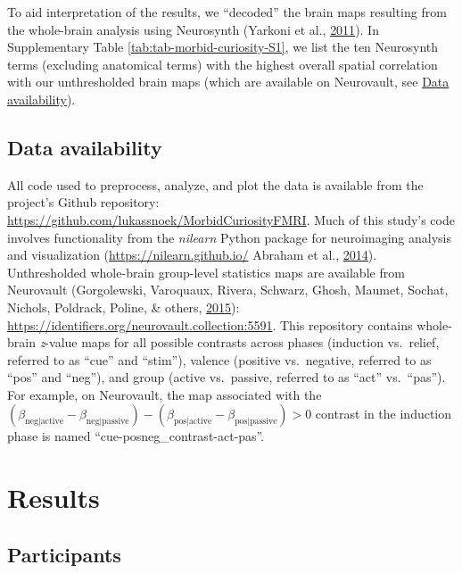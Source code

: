 \documentclass[12pt,american,a4paper,oneside,]{memoir} %
\begin{document}
To aid interpretation of the results, we ``decoded'' the brain maps resulting from the whole-brain analysis using Neurosynth (Yarkoni et al., \protect\hyperlink{ref-yarkoni2011large}{2011}). In Supplementary Table \ref{tab:tab-morbid-curiosity-S1}, we list the ten Neurosynth terms (excluding anatomical terms) with the highest overall spatial correlation with our unthresholded brain maps (which are available on Neurovault, see \protect\hyperlink{morbid-curiosity-data-availability}{Data availability}).

\hypertarget{morbid-curiosity-data-availability}{%
\subsection{Data availability}\label{morbid-curiosity-data-availability}}

All code used to preprocess, analyze, and plot the data is available from the project's Github repository: \url{https://github.com/lukassnoek/MorbidCuriosityFMRI}. Much of this study's code involves functionality from the \emph{nilearn} Python package for neuroimaging analysis and visualization (\url{https://nilearn.github.io/} Abraham et al., \protect\hyperlink{ref-Abraham2014-ef}{2014}). Unthresholded whole-brain group-level statistics maps are available from Neurovault (Gorgolewski, Varoquaux, Rivera, Schwarz, Ghosh, Maumet, Sochat, Nichols, Poldrack, Poline, \& others, \protect\hyperlink{ref-gorgolewski2015neurovault}{2015}): \url{https://identifiers.org/neurovault.collection:5591}. This repository contains whole-brain \emph{z}-value maps for all possible contrasts across phases (induction vs.~relief, referred to as ``cue'' and ``stim''), valence (positive vs.~negative, referred to as ``pos'' and ``neg''), and group (active vs.~passive, referred to as ``act'' vs.~``pas''). For example, on Neurovault, the map associated with the \((\beta_{\mathrm{neg | active}} - \beta_{\mathrm{neg | passive}}) - (\beta_{\mathrm{pos | active}} - \beta_{\mathrm{pos | passive}}) > 0\) contrast in the induction phase is named ``cue-posneg\_contrast-act-pas''.

\hypertarget{morbid-curiosity-results}{%
\section{Results}\label{morbid-curiosity-results}}

\hypertarget{morbid-curiosity-results-participants}{%
\subsection{Participants}\label{morbid-curiosity-results-participants}}
\end{document}
